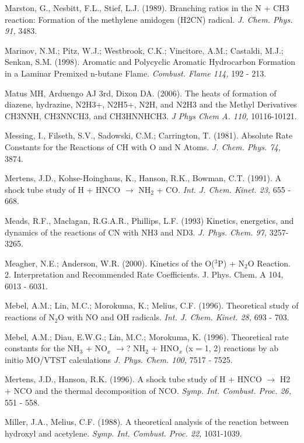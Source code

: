 \documentclass[12pt,landscape]{article}
\newcounter{reaction}
\begin{document}
Marston, G., Nesbitt, F.L., Stief, L.J. (1989). Branching ratios in the N + CH3 reaction: Formation of the methylene amidogen (H2CN) radical.  {\em J. Chem. Phys. 91,} 3483.

Marinov, N.M.; Pitz, W.J.; Westbrook, C.K.; Vincitore, A.M.; Castaldi, M.J.; Senkan, S.M. (1998).
Aromatic and Polycyclic Aromatic Hydrocarbon Formation in a Laminar Premixed n-butane Flame.  {\em Combust. Flame 114,} 192 - 213.

Matus MH, Arduengo AJ 3rd, Dixon DA. (2006).  The heats of formation of diazene, hydrazine, N2H3+, N2H5+, N2H, and N2H3 and the Methyl Derivatives CH3NNH, CH3NNCH3, and CH3HNNHCH3. {\em J Phys Chem A. 110,} 10116-10121.

Messing, I., Filseth, S.V., Sadowski, C.M.; Carrington, T. (1981). Absolute Rate Constants for the Reactions of CH with O and N Atoms.  {\em J. Chem. Phys. 74,} 3874.

Mertens, J.D., Kohse-Hoinghaus, K., Hanson, R.K., Bowman, C.T. (1991).  A shock tube study of H + HNCO $\rightarrow$ NH$_2$ + CO.  {\em Int. J. Chem. Kinet. 23,} 655 - 668.

Meads, R.F., Maclagan, R.G.A.R., Phillips, L.F. (1993) Kinetics, energetics, and dynamics of the reactions of CN with NH3 and ND3.   {\em J. Phys. Chem.  97,} 3257-3265.

Meagher, N.E.; Anderson, W.R. (2000).  Kinetics of the O($^3$P) + N$_2$O Reaction. 2. Interpretation and Recommended Rate Coefficients.  J. Phys. Chem. A  104, 6013 - 6031.

Mebel, A.M.; Lin, M.C.; Morokuma, K.; Melius, C.F. (1996).  Theoretical study of reactions of N$_2$O with NO and OH radicals.  {\em Int. J. Chem. Kinet.  28,}  693 - 703.

Mebel, A.M.; Diau, E.W.G.; Lin, M.C.; Morokuma, K. (1996). Theoretical rate constants for the NH$_3$ + NO$_x$ $\rightarrow$? NH$_2$ + HNO$_x$ (x = 1, 2) reactions by ab initio MO/VTST calculations {\em J. Phys. Chem. 100,} 7517 - 7525.

 Mertens, J.D., Hanson, R.K. (1996). A shock tube study of H + HNCO $\rightarrow$ H2 + NCO and the thermal decomposition of NCO.  {\em Symp. Int. Combust. Proc. 26,} 551 - 558.

Miller, J.A., Melius, C.F. (1988). A theoretical analysis of the reaction between hydroxyl and acetylene. {\em Symp. Int. Combust. Proc. 22,} 1031-1039.
\end{document}
